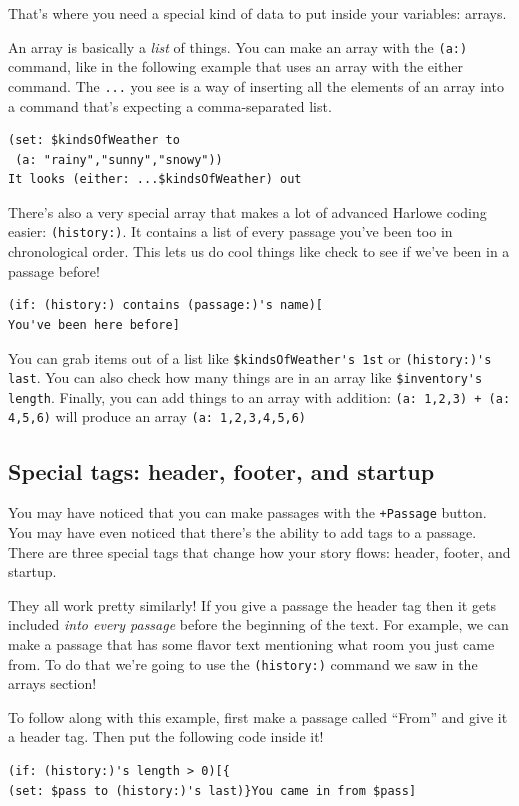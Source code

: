 \documentclass[a5paper,11pt]{article}
\begin{document}
That's where you need a special kind of data to put inside your variables: arrays.

An array is basically a \emph{list} of things. You can make an array with the \verb|(a:)| command, like in the following example that uses an array with the either command. The \verb|...| you see is a way of inserting all the elements of an array into a command that's expecting a comma-separated list.

\begin{verbatim}
(set: $kindsOfWeather to 
 (a: "rainy","sunny","snowy"))
It looks (either: ...$kindsOfWeather) out
\end{verbatim}

There's also a very special array that makes a lot of advanced Harlowe coding easier: \verb|(history:)|. It contains a list of every passage you've been too in chronological order. This lets us do cool things like check to see if we've been in a passage before!

\begin{verbatim}
(if: (history:) contains (passage:)'s name)[
You've been here before]
\end{verbatim}

You can grab items out of a list like \verb|$kindsOfWeather's 1st| or \verb|(history:)'s last|. You can also check how many things are in an array like \verb|$inventory's length|. Finally, you can add things to an array with addition: \verb|(a: 1,2,3) + (a: 4,5,6)| will produce an array \verb|(a: 1,2,3,4,5,6)|

\subsection{Special tags: header, footer, and startup}
You may have noticed that you can make passages with the \verb"+Passage" button. You may have even noticed that there's the ability to add tags to a passage. There are three special tags that change how your story flows: header, footer, and startup.

They all work pretty similarly! If you give a passage the header tag then it gets included \emph{into every passage} before the beginning of the text. For example, we can make a passage that has some flavor text mentioning what room you just came from. To do that we're going to use the \verb|(history:)| command we saw in the arrays section!

To follow along with this example, first make a passage called ``From'' and give it a header tag. Then put the following code inside it!
\begin{verbatim}
(if: (history:)'s length > 0)[{
(set: $pass to (history:)'s last)}You came in from $pass]

\end{verbatim}
\end{document}
